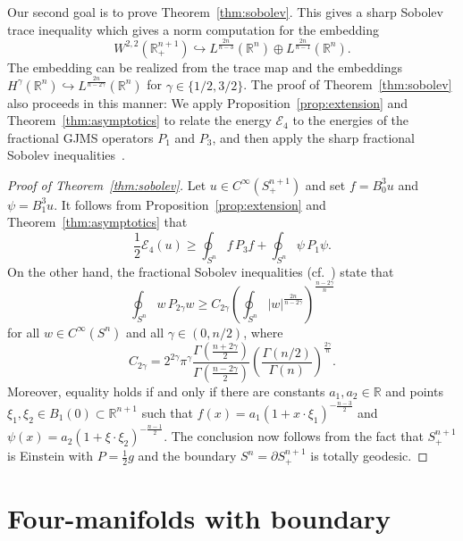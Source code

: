 \documentclass{amsart}
\theoremstyle{definition}
\theoremstyle{remark}
\numberwithin{equation}{section}
\begin{document}
Our second goal is to prove Theorem~\ref{thm:sobolev}.  This gives a sharp Sobolev trace inequality which gives a norm computation for the embedding
\[ W^{2,2}({\mathbb{R}}_+^{n+1}) \hookrightarrow L^{\frac{2n}{n-3}}({\mathbb{R}}^n) \oplus L^{\frac{2n}{n-1}}({\mathbb{R}}^n) . \]
The embedding can be realized from the trace map and the embeddings $H^\gamma({\mathbb{R}}^n)\hookrightarrow L^{\frac{2n}{n-2\gamma}}({\mathbb{R}}^n)$ for $\gamma\in\{1/2,3/2\}$.  The proof of Theorem~\ref{thm:sobolev} also proceeds in this manner: We apply Proposition~\ref{prop:extension} and Theorem~\ref{thm:asymptotics} to relate the energy ${\mathcal{E}}_4$ to the energies of the fractional GJMS operators $P_1$ and $P_3$, and then apply the sharp fractional Sobolev inequalities~\cite{Beckner1993,Lieb1983}.

\begin{proof}[Proof of Theorem~\ref{thm:sobolev}]
 Let $u\in C^\infty(S_+^{n+1})$ and set $f=B_0^3u$ and $\psi=B_1^3u$.  It follows from Proposition~\ref{prop:extension} and Theorem~\ref{thm:asymptotics} that
 \[ \frac{1}{2}{\mathcal{E}}_4(u) \geq \oint_{S^n} f\,P_3f + \oint_{S^n} \psi\,P_1\psi . \]
 On the other hand, the fractional Sobolev inequalities (cf.\ \cite{Beckner1993,Lieb1983}) state that
 \[ \oint_{S^n} w\,P_{2\gamma}w \geq C_{2\gamma}\left(\oint_{S^n} {\lvert} w{\rvert}^{\frac{2n}{n-2\gamma}}\right)^{\frac{n-2\gamma}{n}} \]
 for all $w\in C^\infty(S^n)$ and all $\gamma\in(0,n/2)$, where
 \[ C_{2\gamma} = 2^{2\gamma}\pi^\gamma\frac{\Gamma\left(\frac{n+2\gamma}{2}\right)}{\Gamma\left(\frac{n-2\gamma}{2}\right)}\left(\frac{\Gamma(n/2)}{\Gamma(n)}\right)^{\frac{2\gamma}{n}} . \]
 Moreover, equality holds if and only if there are constants $a_1,a_2\in{\mathbb{R}}$ and points $\xi_1,\xi_2\in B_1(0)\subset{\mathbb{R}}^{n+1}$ such that $f(x)=a_1(1+x\cdot\xi_1)^{-\frac{n-3}{2}}$ and $\psi(x)=a_2(1+\xi\cdot\xi_2)^{-\frac{n-1}{2}}$.  The conclusion now follows from the fact that $S_+^{n+1}$ is Einstein with $P=\frac{1}{2}g$ and the boundary $S^n=\partial S_+^{n+1}$ is totally geodesic.
\end{proof}

\section{Four-manifolds with boundary}
\label{sec:3d}
\end{document}
